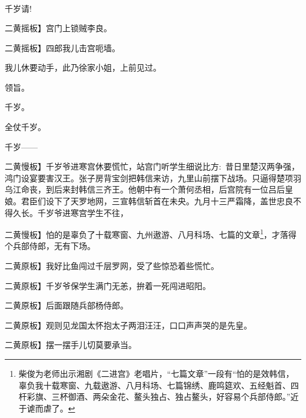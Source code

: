\newpage\hspace{30pt}~

{%

\subsubsection{\large{}}

{千岁请!}\hspace{30pt}~

二黄摇板{】宫门上锁贼李良。}

二黄摇板{】四郎我儿击宫呃墙。}

{我儿休要动手，此乃徐家小姐，上前见过。}

{领旨。}\hspace{40pt}~

{千岁。}\hspace{40pt}~

{全仗千岁。}\hspace{30pt}~

{千岁------}\hspace{20pt}~

二黄慢板{】千岁爷进寒宫休要慌忙，站宫门听学生细说比方:~昔日里楚汉两争强，鸿门设宴要害汉王。张子房背宝剑把韩信来访，九里山前摆下战场。只逼得楚项羽乌江命丧，到后来封韩信三齐王。他朝中有一个萧何丞相，后宫院有一位吕后皇娘。君臣们设下了天罗地网，三宣韩信斩首在未央。九月十三严霜降，盖世忠良不得久长。千岁爷进寒宫学生不往，}

二黄慢板{】怕的是辜负了十载寒窗、九州遨游、八月科场、七篇的文章}\footnote{柴俊为老师出示湘剧《二进宫》老唱片，``七篇文章''一段有``怕的是效韩信，辜负我十载寒窗、九载遨游、八月科场、七篇锦绣、鹿鸣筵欢、五经魁首、四杆彩旗、三杯御酒、两朵金花、鳌头独占、独占鳌头，好容易个兵部侍郎。''近于谑而虐了。}{，才落得个兵部侍郎，无有下场。}

二黄原板{】我好比鱼闯过千层罗网，受了些惊恐着些慌忙。}

二黄原板{】千岁爷保学生满门无恙，拚着一死闯进昭阳。}

二黄原板{】后面跟随兵部杨侍郎。}

二黄原板{】观则见龙国太怀抱太子两泪汪汪，口口声声哭的是先皇。}

二黄原板{】摆一摆手儿切莫要承当。}

}
